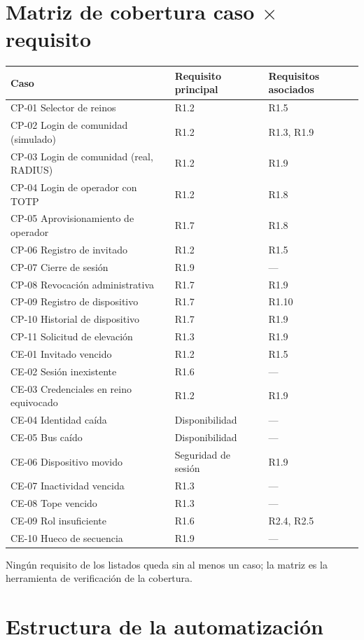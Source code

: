 \documentclass[11pt,a4paper]{article}
\begin{document}
\section{Matriz de cobertura caso $\times$ requisito}

\begin{longtable}{p{5.8cm}p{4.2cm}p{4.0cm}}
\toprule
\textbf{Caso} & \textbf{Requisito principal} & \textbf{Requisitos asociados}\\
\midrule
CP-01 Selector de reinos & R1.2 & R1.5\\
CP-02 Login de comunidad (simulado) & R1.2 & R1.3, R1.9\\
CP-03 Login de comunidad (real, RADIUS) & R1.2 & R1.9\\
CP-04 Login de operador con TOTP & R1.2 & R1.8\\
CP-05 Aprovisionamiento de operador & R1.7 & R1.8\\
CP-06 Registro de invitado & R1.2 & R1.5\\
CP-07 Cierre de sesión & R1.9 & ---\\
CP-08 Revocación administrativa & R1.7 & R1.9\\
CP-09 Registro de dispositivo & R1.7 & R1.10\\
CP-10 Historial de dispositivo & R1.7 & R1.9\\
CP-11 Solicitud de elevación & R1.3 & R1.9\\
CE-01 Invitado vencido & R1.2 & R1.5\\
CE-02 Sesión inexistente & R1.6 & ---\\
CE-03 Credenciales en reino equivocado & R1.2 & R1.9\\
CE-04 Identidad caída & Disponibilidad & ---\\
CE-05 Bus caído & Disponibilidad & ---\\
CE-06 Dispositivo movido & Seguridad de sesión & R1.9\\
CE-07 Inactividad vencida & R1.3 & ---\\
CE-08 Tope vencido & R1.3 & ---\\
CE-09 Rol insuficiente & R1.6 & R2.4, R2.5\\
CE-10 Hueco de secuencia & R1.9 & ---\\
\bottomrule
\end{longtable}

Ningún requisito de los listados queda sin al menos un caso; la matriz es la herramienta de verificación de la cobertura.

\section{Estructura de la automatización}
\end{document}
